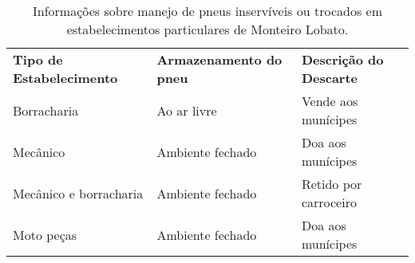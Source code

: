 \begin{table}[htbp]
  \centering
  \caption{Informações sobre manejo de pneus inservíveis ou trocados em estabelecimentos particulares de Monteiro Lobato.}
    \begin{tabular}{p{9.215em}|p{9.285em}|p{8.5em}}
    \rowcolor[rgb]{ .969,  .588,  .275} \textcolor[rgb]{ 1,  1,  1}{\textbf{Tipo de Estabelecimento}} & \textcolor[rgb]{ 1,  1,  1}{\textbf{Armazenamento do pneu }} & \textcolor[rgb]{ 1,  1,  1}{\textbf{Descrição do Descarte}} \\
    \rowcolor[rgb]{ .992,  .914,  .851} Borracharia & Ao ar livre & Vende aos munícipes \\
    \rowcolor[rgb]{ .984,  .831,  .706} Mecânico & Ambiente fechado & Doa aos munícipes \\
    \rowcolor[rgb]{ .992,  .914,  .851} Mecânico e borracharia & Ambiente fechado & Retido por carroceiro \\
    \rowcolor[rgb]{ .984,  .831,  .706} Moto peças & Ambiente fechado  & Doa aos munícipes \\
    \end{tabular}%
  \label{tab:pneus_monteiro}%
\end{table}%
